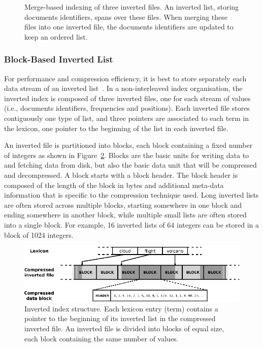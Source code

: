 \begin{figure}
\centering
{}%
\caption{Merge-based indexing of three inverted files. An inverted list, storing
documents identifiers, spans over these files. When merging these files into
one inverted file, the documents identifiers are updated to keep an ordered
list.}
\label{fig:merged-indexing}
\end{figure}

\subsubsection{Block-Based Inverted List}
\label{sec:compression:block}

For performance and compression efficiency, it is best to store separately each
data stream of an inverted list~\cite{anh:2006:siohttq}. In a non-interleaved
index organisation, the inverted index is composed of three inverted files,
one for each stream of values (i.e., documents identifiers, frequencies and
positions). Each inverted file stores contiguously one type of list, and three
pointers are associated to each term in the lexicon, one pointer to the
beginning of the list in each inverted file.

An inverted file is partitioned into blocks, each block containing a fixed
number of integers as shown in Figure~\ref{fig:index-structure}. Blocks are
the basic units for writing data to and fetching data from disk, but also the
basic data unit that will be compressed and decompressed. A block starts with
a block header. The block header is composed of the length of the block in
bytes and additional meta-data information that is specific to the compression
technique used. Long inverted lists are often stored across multiple blocks,
starting somewhere in one block and ending somewhere in another block, while
multiple small lists are often stored into a single block. For example, 16
inverted lists of 64 integers can be stored in a block of 1024 integers.

\begin{figure}
  \centering
	\includegraphics[scale=1.2]{pics/index-structure}
	\caption{Inverted index structure. Each lexicon entry (term) contains a
	pointer to the beginning of its inverted list in the compressed inverted
	file. An inverted file is divided into blocks of equal size, each block
	containing the same number of values.}
	\label{fig:index-structure}
\end{figure}

